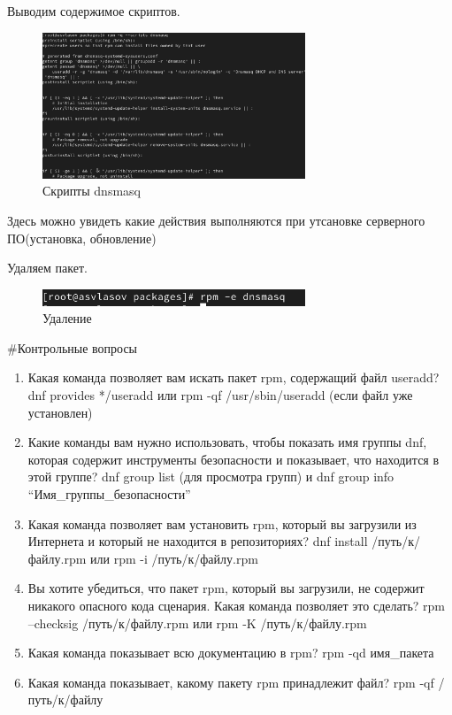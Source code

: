 \documentclass[
  12pt,
  a4paper,
  DIV=11,
  numbers=noendperiod]{scrreprt}
\begin{document}
Выводим содержимое скриптов.

\begin{figure}

{\centering \includegraphics[width=0.7\textwidth,height=\textheight]{image/24.png}

}

\caption{Скрипты dnsmasq}

\end{figure}%

Здесь можно увидеть какие действия выполняются при утсановке серверного
ПО(установка, обновление)

Удаляем пакет.

\begin{figure}

{\centering \includegraphics[width=0.7\textwidth,height=\textheight]{image/25.png}

}

\caption{Удаление}

\end{figure}%

\#Контрольные вопросы

\begin{enumerate}
\def\labelenumi{\arabic{enumi}.}
\item
  Какая команда позволяет вам искать пакет rpm, содержащий файл useradd?
  dnf provides */useradd или rpm -qf /usr/sbin/useradd (если файл уже
  установлен)
\item
  Какие команды вам нужно использовать, чтобы показать имя группы dnf,
  которая содержит инструменты безопасности и показывает, что находится
  в этой группе? dnf group list (для просмотра групп) и dnf group info
  \enquote{Имя\_группы\_безопасности}
\item
  Какая команда позволяет вам установить rpm, который вы загрузили из
  Интернета и который не находится в репозиториях? dnf install
  /путь/к/файлу.rpm или rpm -i /путь/к/файлу.rpm
\item
  Вы хотите убедиться, что пакет rpm, который вы загрузили, не содержит
  никакого опасного кода сценария. Какая команда позволяет это сделать?
  rpm --checksig /путь/к/файлу.rpm или rpm -K /путь/к/файлу.rpm
\item
  Какая команда показывает всю документацию в rpm? rpm -qd имя\_пакета
\item
  Какая команда показывает, какому пакету rpm принадлежит файл? rpm -qf
  /путь/к/файлу
\end{enumerate}
\end{document}
